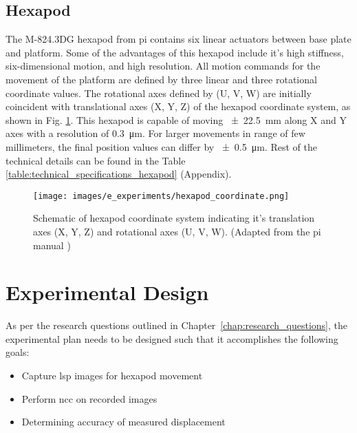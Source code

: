 \subsection{Hexapod}
The M-824.3DG hexapod from \gls{pi} contains six linear actuators between base plate and platform. Some of the advantages of this hexapod include it's high stiffness, six-dimensional motion, and high resolution. All motion commands for the movement of the platform are defined by three linear and three rotational coordinate values. The rotational axes defined by (U, V, W) are initially coincident with translational axes (X, Y, Z) of the hexapod coordinate system, as shown in Fig. \ref{fig:hexapod_coordinate.png}. This hexapod is capable of moving \SI{\pm22.5}{\milli\meter} along X and Y axes with a resolution of \SI{0.3}{\micro\meter}. For larger movements in range of few millimeters, the final position values can differ by \SI{\pm0.5}{\micro\meter}. Rest of the technical details can be found in the Table \ref{table:technical_specifications_hexapod} (Appendix).

\begin{figure}[ht]
    \centering
    \texttt{[image: images/e\_experiments/hexapod\_coordinate.png]}
    \caption{Schematic of hexapod coordinate system indicating it's translation axes (X, Y, Z) and rotational axes (U, V, W). (Adapted from the \gls{pi} manual \cite{hexapod_manual})}
    \label{fig:hexapod_coordinate.png}
\end{figure}

\clearpage


\section{Experimental Design}

As per the research questions outlined in Chapter\ \ref{chap:research_questions}, the experimental plan needs to be designed such that it accomplishes the following goals:

\begin{itemize}
    \item Capture \gls{lsp} images for hexapod movement
    \item Perform \gls{ncc} on recorded images
    \item Determining accuracy of measured displacement
\end{itemize}

